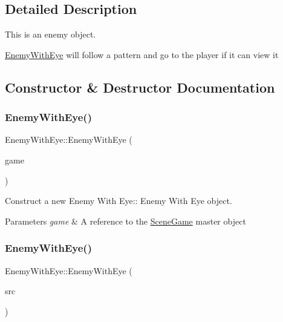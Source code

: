 \subsection{Detailed Description}
This is an enemy object. 

\hyperlink{class_enemy_with_eye}{Enemy\+With\+Eye} will follow a pattern and go to the player if it can view it 

\subsection{Constructor \& Destructor Documentation}
\mbox{\label{class_enemy_with_eye_a552b889b45b9def904bc94451e21467e}} 
\subsubsection{\texorpdfstring{Enemy\+With\+Eye()}{EnemyWithEye()}\hspace{0.1cm}{\footnotesize\ttfamily [1/2]}}
{\footnotesize\ttfamily Enemy\+With\+Eye\+::\+Enemy\+With\+Eye (\begin{DoxyParamCaption}\item[{\hyperlink{class_scene_game}{Scene\+Game} \&}]{game }\end{DoxyParamCaption})\hspace{0.3cm}{\ttfamily [explicit]}}



Construct a new Enemy With Eye\+:\+: Enemy With Eye object. 


\begin{DoxyParams}{Parameters}
{\em game} & A reference to the \hyperlink{class_scene_game}{Scene\+Game} master object \\
\hline
\end{DoxyParams}
\mbox{\label{class_enemy_with_eye_aa128a0204cd6f03796a00d35d071913b}} 
\subsubsection{\texorpdfstring{Enemy\+With\+Eye()}{EnemyWithEye()}\hspace{0.1cm}{\footnotesize\ttfamily [2/2]}}
{\footnotesize\ttfamily Enemy\+With\+Eye\+::\+Enemy\+With\+Eye (\begin{DoxyParamCaption}\item[{\hyperlink{class_enemy_with_eye}{Enemy\+With\+Eye} const \&}]{src }\end{DoxyParamCaption})}



